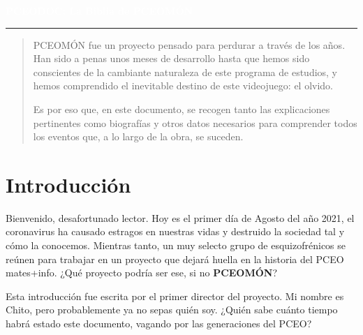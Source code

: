 \documentclass[letterpaper]{article}
\author{%
    \textbf{QQIT} \\
    Equipo de desarrollo de PCEOMÓN \\
    \texttt{pceomon@gmail.com}\vspace{40pt} \\
    }
\makeatletter
\def\printauthor{%
    {\large \@author}}
\makeatother
\begin{document}
\begin{titlepage}
\BgThispage
{}
\vspace*{0.4\textheight}
\noindent
\textcolor{white}{\Huge\textbf{\textsf{PCEODOC: La Biblia de PCEOMÓN}}}
\vspace*{2cm}\par
\noindent
\begin{minipage}{0.35\linewidth}
    \begin{flushright}
        \printauthor
    \end{flushright}
\end{minipage} \hspace{15pt}
%
\begin{minipage}{0.02\linewidth}
    \rule{1pt}{175pt}
\end{minipage} \hspace{-10pt}
%
\begin{minipage}{0.63\linewidth}
\vspace{5pt}
    \begin{abstract}
PCEOMÓN fue un proyecto pensado para perdurar a través de los años. Han sido a penas unos meses de desarrollo hasta que hemos sido conscientes de la cambiante naturaleza de este programa de estudios, y hemos comprendido el inevitable destino de este videojuego: el olvido.

Es por eso que, en este documento, se recogen tanto las explicaciones pertinentes como biografías y otros datos necesarios para comprender todos los eventos que, a lo largo de la obra, se suceden.
    \end{abstract}
\end{minipage}
\end{titlepage}
\restoregeometry

\tableofcontents
\newpage

\section{Introducción}

Bienvenido, desafortunado lector. Hoy es el primer día de Agosto del año 2021, el coronavirus ha causado estragos en nuestras vidas y destruido la sociedad tal y cómo la conocemos. Mientras tanto, un muy selecto grupo de esquizofrénicos se reúnen para trabajar en un proyecto que dejará huella en la historia del PCEO mates+info. ¿Qué proyecto podría ser ese, si no \textbf{PCEOMÓN}?

Esta introducción fue escrita por el primer director del proyecto. Mi nombre es Chito, pero probablemente ya no sepas quién soy. ¿Quién sabe cuánto tiempo habrá estado este documento, vagando por las generaciones del PCEO?
\end{document}
